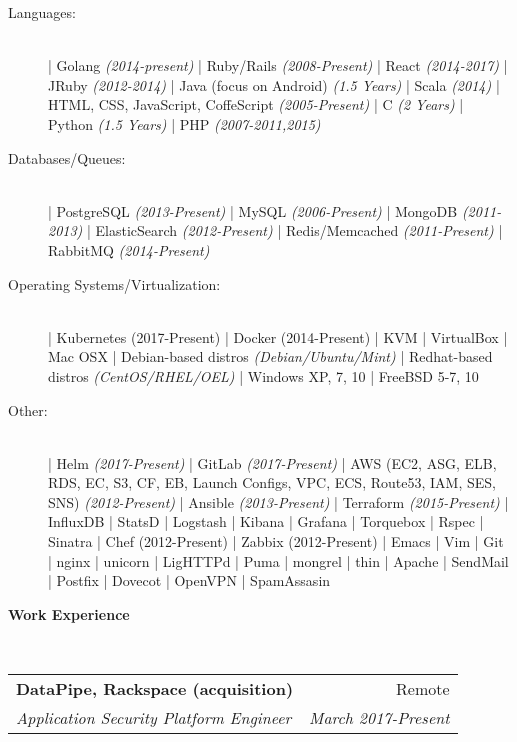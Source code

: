\documentclass[a4paper,11pt,sans]{article}
\makeatletter
\newcommand{\resheading}[1]{{\large \colorbox{myblue}{\begin{minipage}{\textwidth}{\textbf{#1 \vphantom{p\^{E}}}}\end{minipage}}}}
\newcommand{\ressubheading}[4]{
\begin{tabular*}{7.0in}{l@{\extracolsep{\fill}}r}
		\textbf{#1} & #2 \\
		\textit{#3} & \textit{#4} \\
\end{tabular*}\vspace{-6pt}}
\makeatother
\begin{document}
\begin{description}
    \item[Languages:] \hfill \\
        | Golang \textit{(2014-present)}
        | Ruby/Rails \textit{(2008-Present)}
        | React \textit{(2014-2017)}
        | JRuby \textit{(2012-2014)}
        | Java (focus on Android) \textit{(1.5 Years)}
        | Scala \textit{(2014)}
        | HTML, CSS, JavaScript, CoffeScript \textit{(2005-Present)}
        | C \textit{(2 Years)}
        | Python \textit{(1.5 Years)}
        | PHP \textit{(2007-2011,2015)}
    \item[Databases/Queues:] \hfill  \\
        | PostgreSQL \textit{(2013-Present)}
        | MySQL \textit{(2006-Present)}
        | MongoDB \textit{(2011-2013)}
        | ElasticSearch \textit{(2012-Present)}
        | Redis/Memcached \textit{(2011-Present)}
        | RabbitMQ \textit{(2014-Present)}
    \item[Operating Systems/Virtualization:] \hfill \\
        | Kubernetes (2017-Present)
        | Docker (2014-Present)
        | KVM
        | VirtualBox
        | Mac OSX
        | Debian-based distros \textit{(Debian/Ubuntu/Mint)}
        | Redhat-based distros \textit{(CentOS/RHEL/OEL)}
        | Windows XP, 7, 10
        | FreeBSD 5-7, 10
    \item[Other:] \hfill \\
        | Helm \textit{(2017-Present)}  
        | GitLab \textit{(2017-Present)}
        | AWS (EC2, ASG, ELB, RDS, EC, S3, CF, EB, Launch Configs, VPC, ECS, Route53, IAM, SES, SNS) \textit{(2012-Present)}
        | Ansible \textit{(2013-Present)}
        | Terraform \textit{(2015-Present)}
        | InfluxDB
        | StatsD
        | Logstash
        | Kibana
        | Grafana
        | Torquebox
        | Rspec
        | Sinatra
        | Chef (2012-Present)
        | Zabbix (2012-Present)
        | Emacs
        | Vim
        | Git
        | nginx
        | unicorn
        | LigHTTPd
        | Puma
        | mongrel
        | thin
        | Apache
        | SendMail
        | Postfix
        | Dovecot
        | OpenVPN
        | SpamAssasin

\end{description}

\resheading{\color{white} Work Experience}
\hspace{5pt} \\

\ressubheading{DataPipe, Rackspace (acquisition)}{Remote}{Application Security Platform Engineer}{March 2017-Present}
\end{document}
